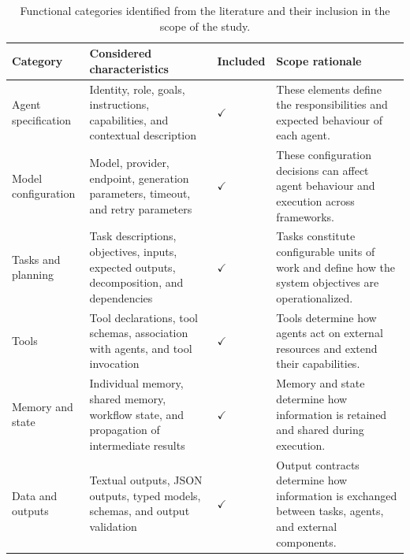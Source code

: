 \begin{table}[t]
    \centering
    \caption{Functional categories identified from the literature and their
    inclusion in the scope of the study.}
    \label{tab:functional-scope}
    \small
    \begin{tabularx}{\textwidth}{
        @{}
        p{}
        >{\raggedright\arraybackslash}X
        >{\centering\arraybackslash}p{}
        p{}
        @{}
    }
        \toprule
        \textbf{Category}
        & \textbf{Considered characteristics}
        & \textbf{Included}
        & \textbf{Scope rationale} \\
        \midrule

        Agent specification
        & Identity, role, goals, instructions, capabilities, and
        contextual description
        & \(\checkmark\)
        & These elements define the responsibilities and expected
        behaviour of each agent. \\

        Model configuration
        & Model, provider, endpoint, generation parameters, timeout, and
        retry parameters
        & \(\checkmark\)
        & These configuration decisions can affect agent behaviour and
        execution across frameworks. \\

        Tasks and planning
        & Task descriptions, objectives, inputs, expected outputs,
        decomposition, and dependencies
        & \(\checkmark\)
        & Tasks constitute configurable units of work and define how the
        system objectives are operationalized. \\

        Tools
        & Tool declarations, tool schemas, association with agents, and
        tool invocation
        & \(\checkmark\)
        & Tools determine how agents act on external resources and extend
        their capabilities. \\

        Memory and state
        & Individual memory, shared memory, workflow state, and propagation of
        intermediate results
        & \(\checkmark\)
        & Memory and state determine how information is retained and
        shared during execution. \\

        Data and outputs
        & Textual outputs, JSON outputs, typed models, schemas, and output
        validation
        & \(\checkmark\)
        & Output contracts determine how information is exchanged between
        tasks, agents, and external components. \\


\end{tabularx}
\end{table}

